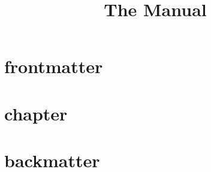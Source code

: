 \documentclass[11pt]{book}
\title{The  Manual}
\author{}
\begin{document}
\maketitle
\def\title#1{\chapter{#1}}
\tableofcontents

\part{frontmatter}
        
        
        
        
        
        
\part{chapter}
        
        
        
        
        
        
        
        
        
        
\part{backmatter}
        
        
\end{document}
